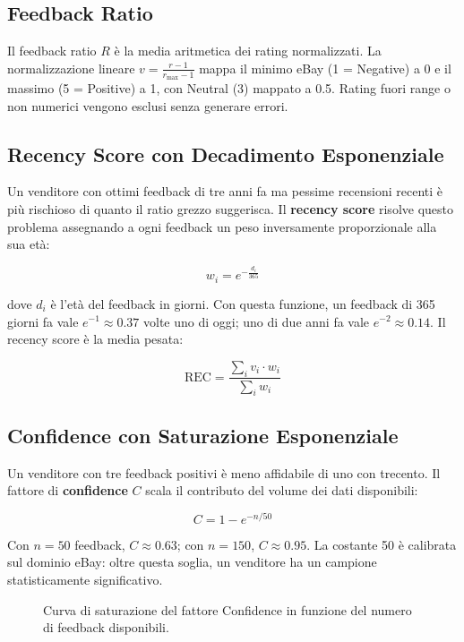 \subsection{Feedback Ratio}
\label{subsec:trust-ratio}

Il feedback ratio $R$ è la media aritmetica dei rating normalizzati.
La normalizzazione lineare
$v = \frac{r - 1}{r_{\max} - 1}$
mappa il minimo eBay (1 = Negative) a 0 e il massimo (5 = Positive)
a 1, con Neutral (3) mappato a 0.5. Rating fuori range o non numerici
vengono esclusi senza generare errori.

\subsection{Recency Score con Decadimento Esponenziale}
\label{subsec:trust-recency}

Un venditore con ottimi feedback di tre anni fa ma pessime recensioni
recenti è più rischioso di quanto il ratio grezzo suggerisca. Il
\textbf{recency score} risolve questo problema assegnando a ogni
feedback un peso inversamente proporzionale alla sua età:

\[
    w_i = e^{-\frac{d_i}{365}}
\]

dove $d_i$ è l'età del feedback in giorni. Con questa funzione, un
feedback di 365 giorni fa vale $e^{-1} \approx 0.37$ volte uno di
oggi; uno di due anni fa vale $e^{-2} \approx 0.14$. Il recency
score è la media pesata:

\[
    \text{REC} = \frac{\sum_i v_i \cdot w_i}{\sum_i w_i}
\]

\subsection{Confidence con Saturazione Esponenziale}
\label{subsec:trust-confidence}

Un venditore con tre feedback positivi è meno affidabile di uno con
trecento. Il fattore di \textbf{confidence} $C$ scala il contributo
del volume dei dati disponibili:

\[
    C = 1 - e^{-n / 50}
\]

Con $n = 50$ feedback, $C \approx 0.63$; con $n = 150$, $C \approx 0.95$.
La costante 50 è calibrata sul dominio eBay: oltre questa soglia, un
venditore ha un campione statisticamente significativo.

\begin{figure}[htbp]
    \centering
    \caption{Curva di saturazione del fattore Confidence in funzione
    del numero di feedback disponibili.}
    \label{fig:trust-confidence-curve}
\end{figure}


